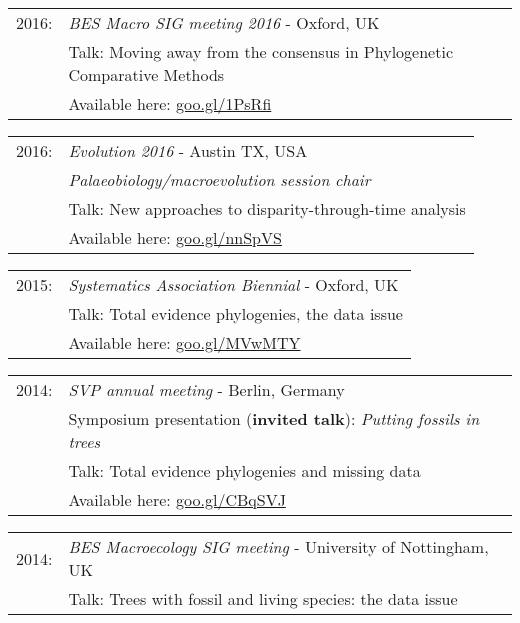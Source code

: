 \documentclass[10pt,a4paper]{article}
\begin{document}
{\begin{tabular}{ll}
2016: & \textit{BES Macro SIG meeting 2016} - Oxford, UK\\
      & Talk: Moving away from the consensus in Phylogenetic Comparative Methods\\
      & Available here: \href{https://figshare.com/articles/Guillerme_BESMacro2016_pdf/3478922}{goo.gl/1PsRfi}\\
\end{tabular}
\begin{tabular}{ll}
2016: & \textit{Evolution 2016} - Austin TX, USA\\
& \textit{Palaeobiology/macroevolution session chair}\\
      & Talk: New approaches to disparity-through-time analysis\\
      & Available here: \href{https://figshare.com/articles/New_approaches_to_disparity-through-time_analysis/3437546}{goo.gl/nnSpVS}\\
\end{tabular}
\begin{tabular}{ll}
2015: & \textit{Systematics Association Biennial} - Oxford, UK\\
      & Talk: Total evidence phylogenies, the data issue\\ 
      & Available here: \href{http://www.slideshare.net/ThomasGuillerme/total-evidence-phylogenies-the-missing-data-issue}{goo.gl/MVwMTY}\\
\end{tabular}
\begin{tabular}{ll}
2014: & \textit{SVP annual meeting} - Berlin, Germany\\
      & Symposium presentation (\textbf{invited talk}): \textit{Putting fossils in trees}\\
      & Talk: Total evidence phylogenies and missing data\\
      & Available here: \href{http://figshare.com/articles/Total_evidence_phylogenies_the_missing_data_issue/1086216}{goo.gl/CBqSVJ}\\
\end{tabular}
\begin{tabular}{ll}
2014: & \textit{BES Macroecology SIG meeting} - University of Nottingham, UK\\
      & Talk: Trees with fossil and living species: the data issue\\ 

\end{tabular}}
\end{document}
